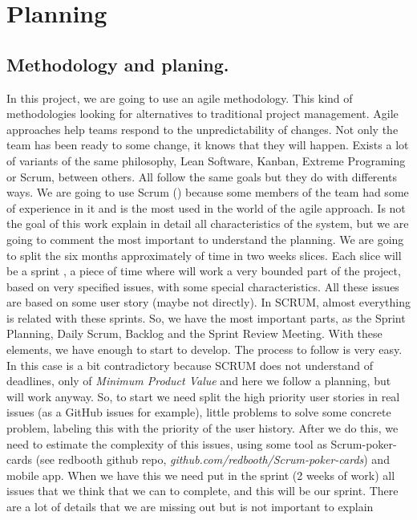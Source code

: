\chapter{Planning}
\section{Methodology and planing.}

In this project, we are going to use an agile methodology.
This kind of methodologies looking for alternatives to traditional project management.
Agile approaches help teams respond to the unpredictability of changes.
Not only the team has been ready to some change, it knows that they will happen.
\intro
Exists a lot of variants of the same philosophy, Lean Software, Kanban,
Extreme Programing or Scrum, between others.
All follow the same goals but they do with differents ways.
\intro
We are going to use Scrum (\cite{scrumbook}) because some members of the team had some of experience
in it and is the most used in the world of the agile approach.
Is not the goal of this work explain in detail all characteristics of the system,
but we are going to comment the most important to understand the planning.
\intro
We are going to split the six months approximately of time in two weeks slices.
Each slice will be a sprint , a piece of time where will work a very bounded part
of the project, based on very specified issues, with some special characteristics.
All these issues are based on some user story (maybe not directly).
\intro
In SCRUM, almost everything is related with these sprints. So, we have the most
important parts, as the Sprint Planning, Daily Scrum, Backlog and the Sprint
Review Meeting. With these elements, we have enough to start to develop.
The process to follow is very easy. In this case is a bit contradictory because
SCRUM does not understand of deadlines, only of \textit{Minimum Product Value}
and here we follow a planning, but will work anyway.
\intro
So, to start we need split the high priority user stories in real issues (as a
GitHub issues for example), little problems to solve some concrete problem,
labeling this with the priority of the user history.
After we do this, we need to estimate the complexity of this issues, using some
tool as Scrum-poker-cards (see redbooth github repo, \textit{github.com/redbooth/Scrum-poker-cards})
and mobile app.  When we have this we need put in the sprint (2 weeks of work)
all issues that we think that we can to complete, and this will be our sprint.
\intro
There are a lot of details that we are missing out but is not important to explain
